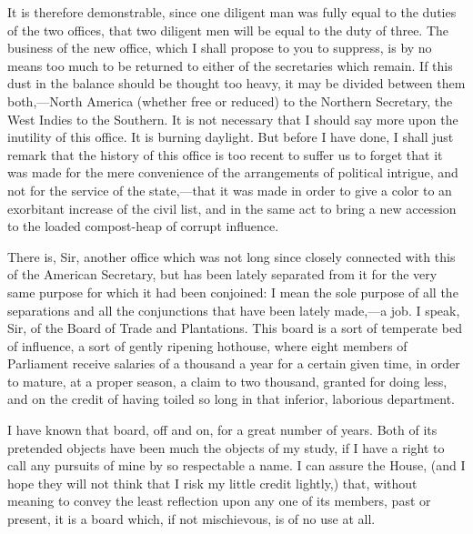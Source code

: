 It is therefore demonstrable, since one diligent man was fully equal to the duties of the two offices, that two diligent men will be equal to the duty of three. The business of the new office, which I shall propose to you to suppress, is by no means too much to be returned to either of the secretaries which remain. If this dust in the balance should be thought too heavy, it may be divided between them both,—North America (whether free or reduced) to the Northern Secretary, the West Indies to the Southern. It is not necessary that I should say more upon the inutility of this office. It is burning daylight. But before I have done, I shall just remark that the history of this office is too recent to suffer us to forget that it was made for the mere convenience of the arrangements of political intrigue, and not for the service of the state,—that it was made in order to give a color to an exorbitant increase of the civil list, and in the same act to bring a new accession to the loaded compost-heap of corrupt influence.

There is, Sir, another office which was not long since closely connected with this of the American Secretary, but has been lately separated from it for the very same purpose for which it had been conjoined: I mean the sole purpose of all the separations and all the conjunctions that have been lately made,—a job. I speak, Sir, of the Board of Trade and Plantations. This board is a sort of temperate bed of influence, a sort of gently ripening hothouse, where eight members of Parliament receive salaries of a thousand a year for a certain given time, in order to mature, at a proper season, a claim to two thousand, granted for doing less, and on the credit of having toiled so long in that inferior, laborious department.

I have known that board, off and on, for a great number of years. Both of its pretended objects have been much the objects of my study, if I have a right to call any pursuits of mine by so respectable a name. I can assure the House, (and I hope they will not think that I risk my little credit lightly,) that, without meaning to convey the least reflection upon any one of its members, past or present, it is a board which, if not mischievous, is of no use at all.

